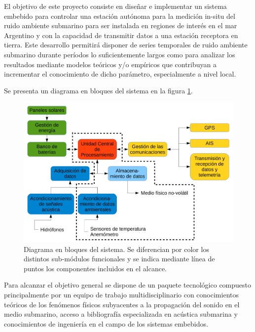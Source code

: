 El objetivo de este proyecto consiste en diseñar e implementar un sistema embebido para controlar una estación autónoma para la medición in-situ del ruido ambiente submarino para ser instalada en regiones de interés en el mar Argentino y con la capacidad de transmitir datos a una estación receptora en tierra. Este desarrollo permitirá disponer de series temporales de ruido ambiente submarino durante períodos lo suficientemente largos como para analizar los resultados mediante modelos teóricos y/o empíricos que contribuyan a incrementar el conocimiento de dicho parámetro, especialmente a nivel local.

Se presenta un diagrama en bloques del sistema en la figura \ref{fig:diagramaBloques}.

\begin{figure}[h]
	\includegraphics[width=\textwidth]{./Figures/Diagrama_en_Bloques_reducido.pdf}
	\caption{Diagrama en bloques del sistema. Se diferencian por color los distintos sub-módulos funcionales y se indica mediante línea de puntos los componentes incluidos en el alcance.}
	\label{fig:diagramaBloques}
\end{figure}

Para alcanzar el objetivo general se dispone de un paquete tecnológico compuesto principalmente por un equipo de trabajo multidisciplinario con conocimientos teóricos de los fenómenos físicos subyacentes a la propagación del sonido en el medio submarino, acceso a bibliografía especializada en acústica submarina y  conocimientos de ingeniería en el campo de los sistemas embebidos.


